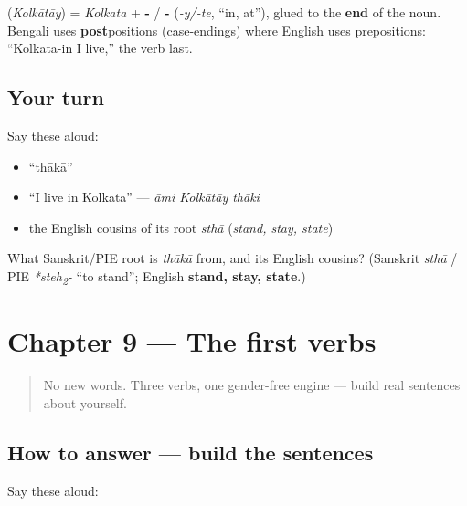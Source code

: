 \begin{grammarlens}[title={Grammar Lens: \textquotedblleft{}in\textquotedblright{} comes after the noun}]
\textbf{} (\emph{Kolkātāy}) = \emph{Kolkata} + \textbf{-} / \textbf{-} (\emph{-y/-te}, \textquotedblleft{}in, at\textquotedblright{}), glued to the \textbf{end} of the noun. Bengali uses \textbf{post}positions (case-endings) where English uses prepositions: \textquotedblleft{}Kolkata-in I live,\textquotedblright{} the verb last.
\end{grammarlens}

\subsection*{Your turn}
Say these aloud:

\begin{itemize}
\raggedright
  \item \textquotedblleft{}thākā\textquotedblright{}
  \item \textquotedblleft{}I live in Kolkata\textquotedblright{} — \emph{āmi Kolkātāy thāki}
  \item the English cousins of its root \emph{sthā} (\emph{stand, stay, state})
\end{itemize}

\begin{tcolorbox}[breakable,colback=teal!4,colframe=teal!35!black,title={Before you move on}]
What Sanskrit/PIE root is \emph{thākā} from, and its English cousins? (Sanskrit \emph{sthā} / PIE \emph{*steh\textsubscript{2}-} \textquotedblleft{}to stand\textquotedblright{}; English \textbf{stand, stay, state}.)
\end{tcolorbox}
\section[Practice]{Chapter 9 — The first verbs}

\label{lesson:BN-C05-practice}



\begin{quote}
No new words. Three verbs, one gender-free engine — build real sentences about yourself.
\end{quote}

\subsection*{How to answer — build the sentences}
Say these aloud:

